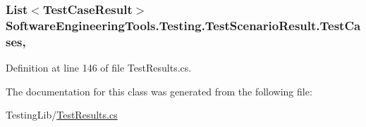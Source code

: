 \hypertarget{class_software_engineering_tools_1_1_testing_1_1_test_scenario_result_ae171a04a0ced528c816ad8b95f566ffb}{
\subsubsection[{Test\+Cases}]{\setlength{\rightskip}{0pt plus 5cm}List$<${\bf Test\+Case\+Result}$>$ Software\+Engineering\+Tools.\+Testing.\+Test\+Scenario\+Result.\+Test\+Cases\hspace{0.3cm}{\ttfamily [get]}, {\ttfamily [set]}}}\label{class_software_engineering_tools_1_1_testing_1_1_test_scenario_result_ae171a04a0ced528c816ad8b95f566ffb}


Definition at line 146 of file Test\+Results.\+cs.



The documentation for this class was generated from the following file\+:\begin{DoxyCompactItemize}
\item 
Testing\+Lib/\hyperlink{_test_results_8cs}{Test\+Results.\+cs}\end{DoxyCompactItemize}
